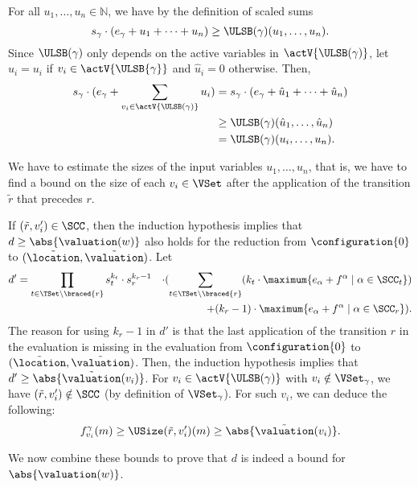 For all $u_1, \dots, u_n \in \mathbb{N}$, we have by the definition of scaled sums
\[ s_\gamma \cdot (e_\gamma + u_1 + \dots + u_n) \geq \ULSB(\gamma)(u_1, \dots, u_n). \]
Since $\ULSB(\gamma)$ only depends on the active variables in $\actV{\ULSB(\gamma)}$, let $\hat{u}_i = u_i$ if $v_i \in \actV{\ULSB{\gamma}}$ and $\hat{u}_i = 0$ otherwise.
Then,
\begin{align*}
  s_\gamma \cdot (e_\gamma + \sum_{v_i \in \actV{\ULSB(\gamma)}} u_i) &= s_\gamma \cdot (e_\gamma + \hat{u}_1 + \dots + \hat{u}_n) \\
  & \geq \ULSB(\gamma)(\hat{u}_1, \dots, \hat{u}_n) \\
  &= \ULSB(\gamma)(u_i, \dots, u_n).
\end{align*}

We have to estimate the sizes of the input variables $u_1, \dots, u_n$,
that is, we have to find a bound on the size of each $v_i \in \VSet$ after the application of the transition $\tilde{r}$ that precedes $r$.

If $(\tilde{r}, v'_i) \in \SCC$, then the induction hypothesis implies that $d \geq \abs{\valuation(w)}$ also holds for the reduction from $\configuration{0}$ to $(\tilde{\location}, \tilde{\valuation})$.
Let
\begin{align*}
  d' &= \prod_{t \in \TSet \setminus \braced{r}} s^{k_t}_t \cdot s^{k_r - 1}_r & \cdot (\sum_{t \in \TSet \setminus \braced{r}} (k_t \cdot \maximum{e_\alpha + f^\alpha \mid \alpha \in \SCC_t}) \\
  & & + (k_r - 1) \cdot \maximum{e_\alpha + f^\alpha \mid \alpha \in \SCC_r}).
\end{align*}
The reason for using $k_r - 1$ in $d'$ is that the last application of the transition $r$ in the evaluation is missing in the evaluation from $\configuration{0}$ to $(\tilde{\location}, \tilde{\valuation})$.
Then, the induction hypothesis implies that $d' \geq \abs{\tilde{\valuation}(v_i)}$.
For $v_i \in \actV{\ULSB(\gamma)}$ with $v_i \notin \VSet_\gamma$, we have $(\tilde{r}, v'_i) \notin \SCC$ (by definition of $\VSet_\gamma$).
For such $v_i$, we can deduce the following:
\[ f^\gamma_{v_i}(m) \geq \USize(\tilde{r}, v'_i)(m) \geq \abs{\tilde{\valuation}(v_i)}. \]

We now combine these bounds to prove that $d$ is indeed a bound for $\abs{\valuation(w)}$.

